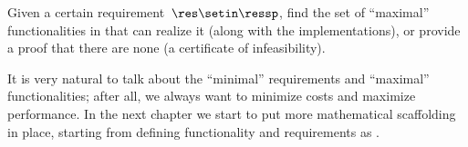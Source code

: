 \begin{problem}[\FixResMaxFun]
\label{prob:FixResMaxFun-informal}
Given a certain requirement~$\res\setin\ressp$, find the set of ``maximal'' functionalities in that can realize it (along with the implementations), or provide a proof that there are none (a certificate of infeasibility).
\end{problem}

It is very natural to talk about the ``minimal'' requirements and ``maximal'' functionalities; after all, we always want to minimize costs and maximize performance.
In the next chapter we start to put more mathematical scaffolding in place, starting from defining functionality and requirements as .


